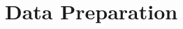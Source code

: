 \documentclass[12pt,a4paper]{article}
\begin{document}

\section{Data Preparation}
\label{sec:data-preparation}

%
\end{document}
